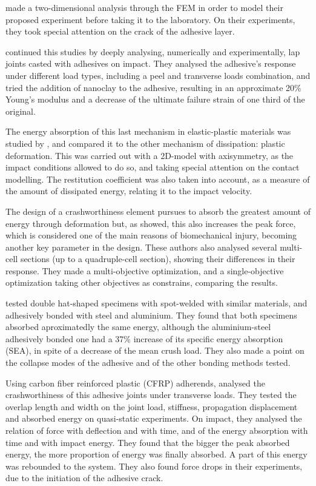 \citet{Kihara2003} made a two-dimensional analysis through the FEM in order to model their proposed experiment before taking it to the laboratory. On their experiments, they took special attention on the crack of the adhesive layer.

\citet{Vaidya2006} continued this studies by deeply analysing, numerically and experimentally, lap joints casted with adhesives on impact. They analysed the adhesive's response under different load types, including a peel and transverse loads combination, and tried the addition of nanoclay to the adhesive, resulting in an approximate 20\% Young's modulus and a decrease of the ultimate failure strain of one third of the original.

The energy absorption of this last mechanism in elastic-plastic materials was studied by \citet{Wu2006}, and compared it to the other mechanism of dissipation: plastic deformation. This was carried out with a 2D-model with axisymmetry, as the impact conditions allowed to do so, and taking special attention on the contact modelling. The restitution coefficient was also taken into account, as a measure of the amount of dissipated energy, relating it to the impact velocity.

The design of a crashworthiness element pursues to absorb the greatest amount of energy through deformation but, as \citet{Hou2008} showed, this also increases the peak force, which is considered one of the main reasons of biomechanical injury, becoming another key parameter in the design. These authors also analysed several multi-cell sections (up to a quadruple-cell section), showing their differences in their response. They made a multi-objective optimization, and a single-objective optimization taking other objectives as constrains, comparing the results.

\citet{Lee2006} tested double hat-shaped specimens with spot-welded with similar materials, and adhesively bonded with steel and aluminium. They found that both specimens absorbed aproximatedly the same energy, although the aluminium-steel adhesively bonded one had a 37\% increase of its specific energy absorption (SEA), in spite of a decrease of the mean crush load. They also made a point on the collapse modes of the adhesive and of the other bonding methods tested.

Using carbon fiber reinforced plastic (CFRP) adherends, \citet{Wu2013} analysed the crashworthiness of this adhesive joints under transverse loads. They tested the overlap length and width on the joint load, stiffness, propagation displacement and absorbed energy on quasi-static experiments. On impact, they analysed the relation of force with deflection and with time, and of the energy absorption with time and with impact energy. They found that the bigger the peak absorbed energy, the more proportion of energy was finally absorbed. A part of this energy was rebounded to the system. They also found force drops in their experiments, due to the initiation of the adhesive crack.

